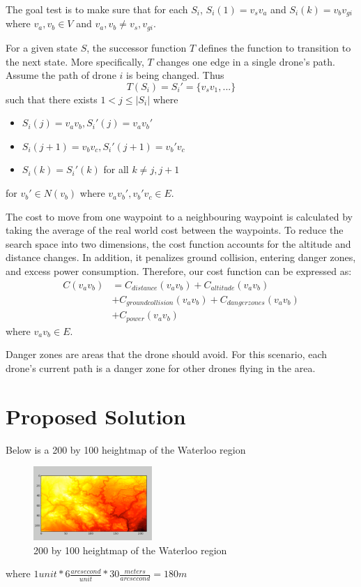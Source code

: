 \documentclass[conference]{IEEEtran}
\begin{document}
The goal test is to make sure that for each $S_i$, $S_i(1) = v_sv_a$ and $S_i(k) = v_bv_{gi}$ where $v_a, v_b \in V$ and $v_a, v_b \neq v_s, v_{gi}$.

For a given state $S$, the successor function $T$ defines the function to transition to the next state. More specifically, $T$ changes one edge in a single drone's path. Assume the path of drone $i$ is being changed. Thus
$$ T(S_i) = S_i' = \{ v_sv_1, ... \} $$
such that there exists $ 1 < j \leq |S_i| $ where
\begin{itemize}
\item $S_i(j) = v_av_b, S_i'(j) = v_av_b'$
\item $S_i(j+1) = v_bv_c, S_i'(j+1) = v_b'v_c$
\item $S_i(k) = S_i'(k)$ for all $k \neq j, j+1$
\end{itemize}
for $v_b' \in N(v_b)$ where $v_av_b', v_b'v_c \in E$.

The cost to move from one waypoint to a neighbouring waypoint is calculated by taking the average of the real world cost between the waypoints. To reduce the search space into two dimensions, the cost function accounts for the altitude and distance changes. In addition, it penalizes ground collision, entering danger zones, and excess power consumption. Therefore, our cost function can be expressed as:
\begin{equation} \label{eq:cost}
\begin{split}
C(v_av_b) &= C_{distance}(v_av_b) + C_{altitude}(v_av_b) \\
&+ C_{ground collision}(v_av_b) + C_{danger zones}(v_av_b) \\
&+ C_{power}(v_av_b)
\end{split}
\end{equation}
where $v_av_b \in E$.

Danger zones are areas that the drone should avoid. For this scenario, each drone's current path is a danger zone for other drones flying in the area.

\section{Proposed Solution}
Below is a 200 by 100 heightmap of the Waterloo region
\begin{figure}[htbp] \label{img:heightmap1}
\centerline{\includegraphics[width=0.4\textwidth]{images/heightmap_orig.png}}
\caption{200 by 100 heightmap of the Waterloo region}
\label{fig}
\end{figure}
where $1 unit * 6 \frac{arcsecond}{unit} * 30 \frac{meters}{arcsecond} = 180m$
\end{document}

